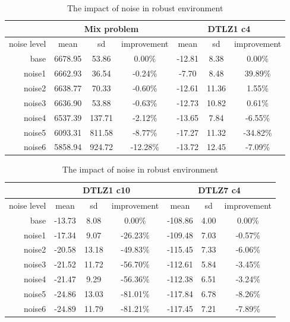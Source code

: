 \begin{table}[htb]
  \centering
  \begin{tabular}{r c c c c c c}
    & \multicolumn{3}{c}{Mix problem} & \multicolumn{3}{c}{DTLZ1 c4} \\
    \hline
    noise level & mean & sd & improvement & mean & sd & improvement \\
    \hline
    \hline
    base & 6678.95 & 53.86 & 0.00\% & -12.81 & 8.38 & 0.00\% \\
    noise1 & 6662.93 & 36.54 & -0.24\% & -7.70 & 8.48 & 39.89\% \\
    noise2 & 6638.77 & 70.33 & -0.60\% & -12.61 & 11.36 & 1.55\% \\
    noise3 & 6636.90 & 53.88 & -0.63\% & -12.73 & 10.82 & 0.61\% \\
    noise4 & 6537.39 & 137.71 & -2.12\% & -13.65 & 7.84 & -6.55\% \\
    noise5 & 6093.31 & 811.58 & -8.77\% & -17.27 & 11.32 & -34.82\% \\
    noise6 & 5858.94 & 924.72 & -12.28\% & -13.72 & 12.45 & -7.09\% \\
    \hline
  \end{tabular}
  \caption{The impact of noise in robust environment}
  \label{t:un_noise_1}
\end{table}

 \begin{table}[htb]
  \centering
  \begin{tabular}{r c c c c c c}
    & \multicolumn{3}{c}{DTLZ1 c10} & \multicolumn{3}{c}{DTLZ7 c4} \\
    \hline
    noise level & mean & sd & improvement & mean & sd & improvement \\
    \hline
    \hline
    base & -13.73 & 8.08 & 0.00\% & -108.86 & 4.00 & 0.00\% \\
    noise1 & -17.34 & 9.07 & -26.23\% & -109.48 & 7.03 & -0.57\% \\
    noise2 & -20.58 & 13.18 & -49.83\% & -115.45 & 7.33 & -6.06\% \\
    noise3 & -21.52 & 11.72 & -56.70\% & -112.61 & 5.84 & -3.45\% \\
    noise4 & -21.47 & 9.29 & -56.36\% & -112.38 & 6.51 & -3.24\% \\
    noise5 & -24.86 & 13.03 & -81.01\% & -117.84 & 6.78 & -8.26\% \\
    noise6 & -24.89 & 11.79 & -81.21\% & -117.45 & 7.21 & -7.89\% \\
    \hline
  \end{tabular}
  \caption{The impact of noise in robust environment}
  \label{t:un_noise_2}
\end{table}

